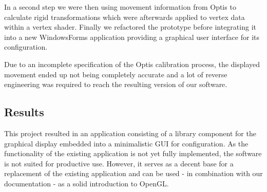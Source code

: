 	In  a  second  step  we  were  then  using movement information from Optis to calculate rigid transformations which were afterwards applied to vertex data within a vertex shader. Finally we refactored the  prototype  before integrating  it  into  a  new  WindowsForms  application providing a graphical user interface for its configuration. 
	
	Due to an incomplete specification  of  the  Optis  calibration  process,  the  displayed  movement  ended up not being completely accurate and a lot of reverse engineering was required to reach the resulting version of our software.
	
	\subsection{Results}
	
	This project resulted in an application consisting of a library component for the graphical display embedded into a minimalistic GUI for configuration. As the functionality of the existing application is not yet fully implemented, the software is not suited for productive use. However, it serves as a decent base for a replacement of the existing application and can be used - in combination with our documentation - as a solid introduction to OpenGL.